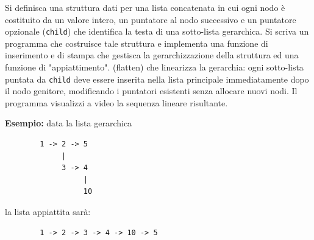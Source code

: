 \begin{Exercise}[label={ex:flatten}]
    Si definisca una struttura dati per una lista concatenata in cui ogni nodo è 
    costituito da un valore intero, un puntatore al nodo successivo e un puntatore opzionale (\texttt{child}) 
    che identifica la testa di una sotto-lista gerarchica. 
    Si scriva un programma che costruisce tale struttura e implementa una funzione di inserimento e di stampa che gestisca
    la gerarchizzazione della struttura ed una funzione di "appiattimento".
    (flatten) che linearizza la gerarchia: ogni sotto-lista puntata da \texttt{child} deve essere inserita nella lista principale 
    immediatamente dopo il nodo genitore, modificando i puntatori esistenti senza allocare nuovi nodi. 
    Il programma visualizzi a video la sequenza lineare risultante.
    
    \textbf{Esempio:} data la lista gerarchica
    \begin{verbatim}
        1 -> 2 -> 5
             |
             3 -> 4
                  |
                  10
    \end{verbatim}
    la lista appiattita sarà:
    \begin{verbatim}
        1 -> 2 -> 3 -> 4 -> 10 -> 5
    \end{verbatim}
\end{Exercise}

\begin{Answer}[ref={ex:flatten}]
  	
\end{Answer}